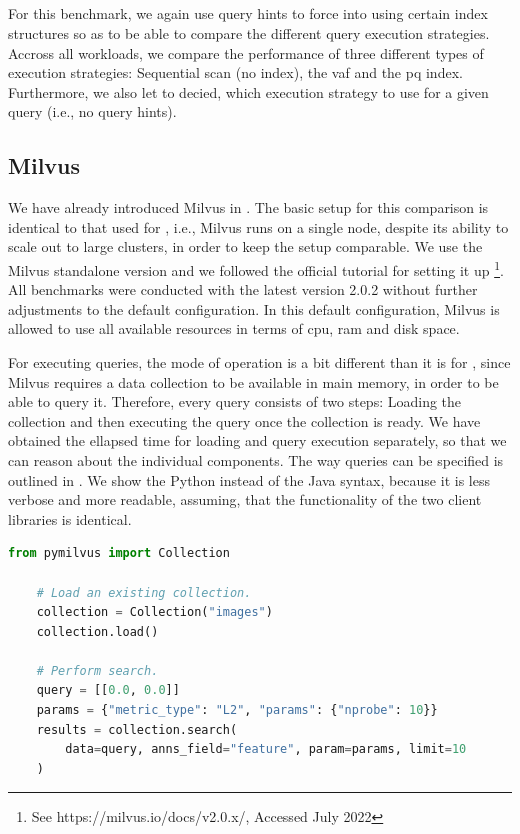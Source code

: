 \subsection{\cottontail}
For this benchmark, we again use query hints to force \cottontail{} into using certain index structures so as to be able to compare the different query execution strategies. Accross all workloads, we compare the performance of three different types of execution strategies: Sequential scan (no index), the \acrshort{vaf} and the \acrshort{pq} index. Furthermore, we also let \cottontail{} to decied, which execution strategy to use for a given query (i.e., no query hints).


\subsection{Milvus}
We have already introduced Milvus \cite{Wang:2021Milvus} in . The basic setup for this comparison is identical to that used for \cottontail{}, i.e., Milvus runs on a single node, despite its ability to scale out to large clusters, in order to keep the setup comparable. We use the Milvus standalone version and we followed the official tutorial for setting it up \footnote{See https://milvus.io/docs/v2.0.x/, Accessed July 2022}. All benchmarks were conducted with the latest version 2.0.2 without further adjustments to the default configuration. In this default configuration, Milvus is allowed to use all available resources in terms of \acrshort{cpu}, \acrshort{ram} and disk space.

For executing queries, the mode of operation is a bit different than it is for \cottontail, since Milvus requires a data collection to be available in main memory, in order to be able to query it. Therefore, every query consists of two steps: Loading the collection and then executing the query once the collection is ready. We have obtained the ellapsed time for loading and query execution separately, so that we can reason about the individual components. The way queries can be specified is outlined in . We show the Python instead of the Java syntax, because it is less verbose and more readable, assuming, that the functionality of the two client libraries is identical.  

\begin{lstlisting}[language=Python, caption={Example of a similarity search query to Milvus in Python on a 2-dimensional vector with the prior loading of a data collection ``images''.}, label=listing:milvus_query, numbers=none]
    from pymilvus import Collection
    
    # Load an existing collection.
    collection = Collection("images")      
    collection.load()

    # Perform search.
    query = [[0.0, 0.0]]
    params = {"metric_type": "L2", "params": {"nprobe": 10}}
    results = collection.search(
        data=query, anns_field="feature", param=params, limit=10
    )
\end{lstlisting}

